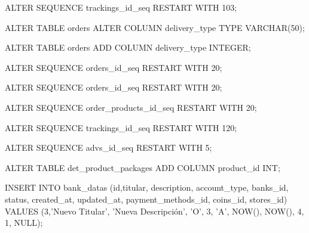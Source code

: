 ALTER SEQUENCE trackings_id_seq RESTART WITH 103;


ALTER TABLE orders
ALTER COLUMN delivery_type TYPE VARCHAR(50);

ALTER TABLE orders
ADD COLUMN delivery_type INTEGER;


ALTER SEQUENCE orders_id_seq RESTART WITH 20;

ALTER SEQUENCE orders_id_seq RESTART WITH 20;


ALTER SEQUENCE order_products_id_seq RESTART WITH 20;

ALTER SEQUENCE trackings_id_seq RESTART WITH 120;

ALTER SEQUENCE advs_id_seq RESTART WITH 5;

ALTER TABLE det_product_packages ADD COLUMN product_id INT;


INSERT INTO bank_datas (id,titular, description, account_type, banks_id, status, created_at, updated_at, payment_methods_id, coins_id, stores_id)
VALUES (3,'Nuevo Titular', 'Nueva Descripción', 'O', 3, 'A', NOW(), NOW(), 4, 1, NULL);











